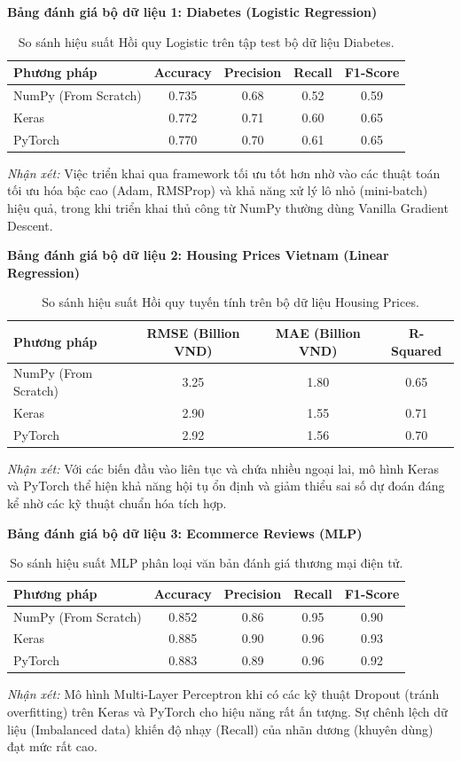 \documentclass[12pt,a4paper]{article}
\begin{document}
\textbf{Bảng đánh giá bộ dữ liệu 1: Diabetes (Logistic Regression)}
\begin{table}[h]
\centering
\begin{tabular}{|l|c|c|c|c|}
\hline
\textbf{Phương pháp} & \textbf{Accuracy} & \textbf{Precision} & \textbf{Recall} & \textbf{F1-Score} \\
\hline
NumPy (From Scratch) & 0.735 & 0.68 & 0.52 & 0.59 \\
Keras & 0.772 & 0.71 & 0.60 & 0.65 \\
PyTorch & 0.770 & 0.70 & 0.61 & 0.65 \\
\hline
\end{tabular}
\caption{So sánh hiệu suất Hồi quy Logistic trên tập test bộ dữ liệu Diabetes.}
\end{table}
\textit{Nhận xét:} Việc triển khai qua framework tối ưu tốt hơn nhờ vào các thuật toán tối ưu hóa bậc cao (Adam, RMSProp) và khả năng xử lý lô nhỏ (mini-batch) hiệu quả, trong khi triển khai thủ công từ NumPy thường dùng Vanilla Gradient Descent.

\textbf{Bảng đánh giá bộ dữ liệu 2: Housing Prices Vietnam (Linear Regression)}
\begin{table}[h]
\centering
\begin{tabular}{|l|c|c|c|}
\hline
\textbf{Phương pháp} & \textbf{RMSE} (Billion VND) & \textbf{MAE} (Billion VND) & \textbf{R-Squared} \\
\hline
NumPy (From Scratch) & 3.25 & 1.80 & 0.65 \\
Keras & 2.90 & 1.55 & 0.71 \\
PyTorch & 2.92 & 1.56 & 0.70 \\
\hline
\end{tabular}
\caption{So sánh hiệu suất Hồi quy tuyến tính trên bộ dữ liệu Housing Prices.}
\end{table}
\textit{Nhận xét:} Với các biến đầu vào liên tục và chứa nhiều ngoại lai, mô hình Keras và PyTorch thể hiện khả năng hội tụ ổn định và giảm thiểu sai số dự đoán đáng kể nhờ các kỹ thuật chuẩn hóa tích hợp.

\textbf{Bảng đánh giá bộ dữ liệu 3: Ecommerce Reviews (MLP)}
\begin{table}[h]
\centering
\begin{tabular}{|l|c|c|c|c|}
\hline
\textbf{Phương pháp} & \textbf{Accuracy} & \textbf{Precision} & \textbf{Recall} & \textbf{F1-Score} \\
\hline
NumPy (From Scratch) & 0.852 & 0.86 & 0.95 & 0.90 \\
Keras & 0.885 & 0.90 & 0.96 & 0.93 \\
PyTorch & 0.883 & 0.89 & 0.96 & 0.92 \\
\hline
\end{tabular}
\caption{So sánh hiệu suất MLP phân loại văn bản đánh giá thương mại điện tử.}
\end{table}
\textit{Nhận xét:} Mô hình Multi-Layer Perceptron khi có các kỹ thuật Dropout (tránh overfitting) trên Keras và PyTorch cho hiệu năng rất ấn tượng. Sự chênh lệch dữ liệu (Imbalanced data) khiến độ nhạy (Recall) của nhãn dương (khuyên dùng) đạt mức rất cao.
\end{document}
